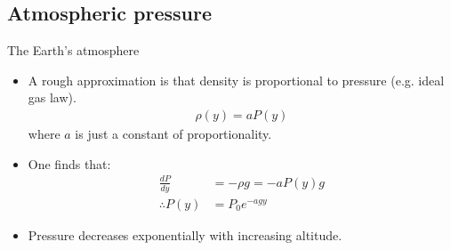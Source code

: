 \documentclass[aspectratio=169,
hyperref={colorlinks,urlcolor=blue}
]{beamer}
\begin{document}
\subsection{Atmospheric pressure}
\begin{frame}{The Earth's atmosphere}
\begin{itemize}
\item A rough approximation is that density is proportional to pressure (e.g. ideal gas law).
\begin{align*}
\rho(y) = a P(y)
\end{align*}
where $a$ is just a constant of proportionality.

\item One finds that:
\begin{align*}
\frac{dP}{dy}&=-\rho g=-a P(y) g\\
\therefore P(y) &= P_0 e^{-agy}
\end{align*}

\item Pressure decreases exponentially with increasing altitude.
\end{itemize}
\end{frame}


\end{document}
